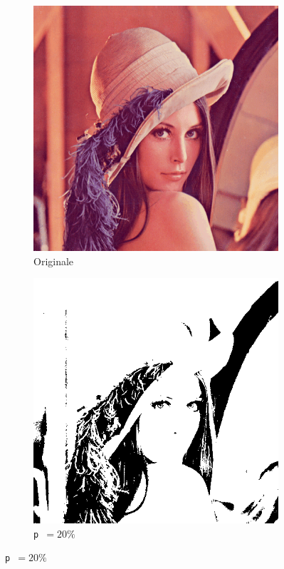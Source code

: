 \documentclass[12pt]{article}
\begin{document}
    \begin{figure}[H]
      \centering
      \begin{subfigure}[b]{0.33\textwidth}
        \centering
        \includegraphics[width=\textwidth]{tex/img/lena.png}
        \caption*{Originale}
      \end{subfigure}
      \hspace{0.15\textwidth}
      \begin{subfigure}[b]{0.33\textwidth}
        \centering
        \includegraphics[width=\textwidth]{img/lena-threshold-20.png}
        \caption*{\texttt{p }\( = 20\%\)}
      \end{subfigure}


\end{figure}
\end{document}
